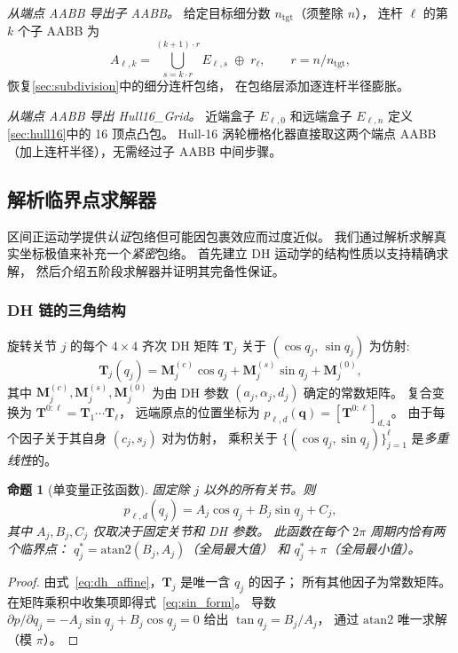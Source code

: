 \documentclass[journal]{IEEEtran}
\newtheorem{proposition}{命题}
\newcommand{\bT}{\mathbf{T}}
\begin{document}
\emph{从端点 AABB 导出子 AABB。}
给定目标细分数 $n_\text{tgt}$（须整除 $n$），
连杆 $\ell$ 的第 $k$ 个子 AABB 为
\begin{equation}
  A_{\ell,k} = \bigcup_{s = k\cdot r}^{(k+1)\cdot r}\!E_{\ell,s}
  \;\oplus\; r_\ell,
  \qquad r = n / n_\text{tgt},
\end{equation}
恢复\cref{sec:subdivision}中的细分连杆包络，
在包络层添加逐连杆半径膨胀。

\emph{从端点 AABB 导出 Hull16\_Grid。}
近端盒子 $E_{\ell,0}$ 和远端盒子 $E_{\ell,n}$
定义\cref{sec:hull16}中的 16 顶点凸包。
Hull-16 涡轮栅格化器直接取这两个端点 AABB
（加上连杆半径），无需经过子 AABB 中间步骤。

\subsection{解析临界点求解器}\label{sec:critical}

区间正运动学提供\emph{认证}包络但可能因包裹效应而过度近似。
我们通过解析求解真实坐标极值来补充一个\emph{紧密}包络。
首先建立 DH 运动学的结构性质以支持精确求解，
然后介绍五阶段求解器并证明其完备性保证。


\subsubsection{DH 链的三角结构}\label{sec:critical_structure}

旋转关节 $j$ 的每个 $4{\times}4$ 齐次 DH 矩阵 $\bT_j$
关于 $(\cos q_j,\,\sin q_j)$ 为仿射:
\begin{equation}\label{eq:dh_affine}
  \bT_j(q_j)
  = \bm{M}_j^{(c)}\cos q_j
  + \bm{M}_j^{(s)}\sin q_j
  + \bm{M}_j^{(0)},
\end{equation}
其中 $\bm{M}_j^{(c)}, \bm{M}_j^{(s)}, \bm{M}_j^{(0)}$
为由 DH 参数 $(a_j,\alpha_j,d_j)$ 确定的常数矩阵。
复合变换为
$\bT^{0:\ell} = \bT_1 \cdots \bT_\ell$，
远端原点的位置坐标为
$p_{\ell,d}(\bm{q}) = [\bT^{0:\ell}]_{d,4}$。
由于每个因子关于其自身 $(c_j,s_j)$ 对为仿射，
乘积关于
$\{(\cos q_j,\sin q_j)\}_{j=1}^\ell$
是\emph{多重线性}的。

\begin{proposition}[单变量正弦函数]\label{prop:sinusoid}
固定除 $j$ 以外的所有关节。则
\begin{equation}\label{eq:sin_form}
  p_{\ell,d}(q_j)
  = A_j\cos q_j + B_j\sin q_j + C_j,
\end{equation}
其中 $A_j, B_j, C_j$ 仅取决于固定关节和 DH 参数。
此函数在每个 $2\pi$ 周期内恰有\emph{两个}临界点：
$q_j^* = \mathrm{atan2}(B_j,A_j)$（全局最大值）
和 $q_j^* + \pi$（全局最小值）。
\end{proposition}
\begin{proof}
由式~\eqref{eq:dh_affine}，$\bT_j$ 是唯一含 $q_j$ 的因子；
所有其他因子为常数矩阵。
在矩阵乘积中收集项即得式~\eqref{eq:sin_form}。
导数
$\partial p/\partial q_j = -A_j\sin q_j + B_j\cos q_j = 0$
给出 $\tan q_j = B_j/A_j$，
通过 $\mathrm{atan2}$ 唯一求解（模 $\pi$）。
\end{proof}
\end{document}
